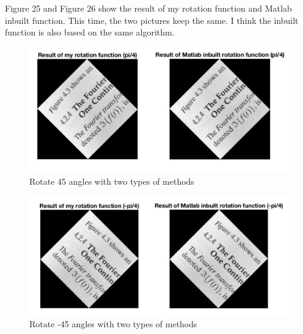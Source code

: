 \documentclass{article}
\begin{document}
Figure 25 and Figure 26 show the result of my rotation function and Matlab inbuilt function. This time, the two pictures keep the same. I think the inbuilt function is also based on the same algorithm.

\begin{figure}[htbp]
    \centering
    \includegraphics[scale = 0.25]{fig22.jpg}
    \caption{Rotate 45 angles with two types of methods}
    \label{fig22}
\end{figure}

\begin{figure}[htbp]
    \centering
    \includegraphics[scale = 0.25]{fig23.jpg}
    \caption{Rotate -45 angles with two types of methods}
    \label{fig23}
\end{figure}
\end{document}
